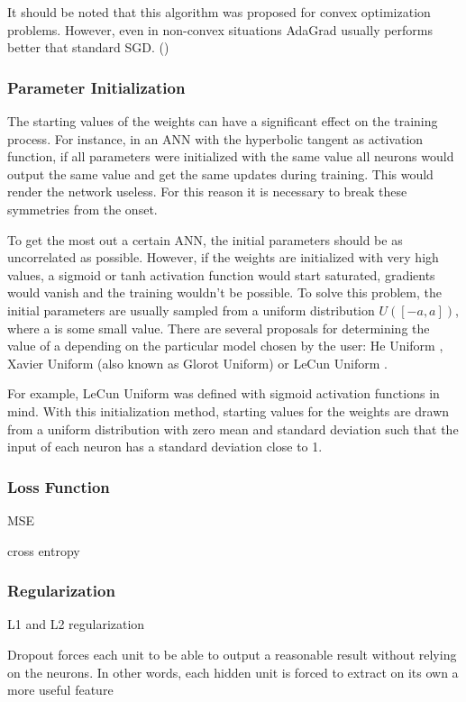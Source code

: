It should be noted that this algorithm was proposed for convex optimization problems. However, even in non-convex situations AdaGrad usually performs better that standard SGD. (\cite{gupta2014training})

\subsubsection{Parameter Initialization}

The starting values of the weights can have a significant effect on the training process. For instance, in an ANN with the hyperbolic tangent as activation function, if all parameters were initialized with the same value all neurons would output the same value and get the same updates during training. This would render the network useless. For this reason it is necessary to break these symmetries from the onset.

To get the most out a certain ANN, the initial parameters should be as  uncorrelated as possible. However, if the weights are initialized with very high values, a sigmoid or tanh activation function would start saturated, gradients would vanish and the training wouldn't be possible.
To solve this problem, the initial parameters are usually  sampled from a uniform distribution $U([-a,a])$, where a is some small value. There are several proposals for determining the value of a depending on the particular model chosen by the user: He Uniform \cite{he2015delving}, Xavier Uniform \cite{glorot2010understanding} (also known as Glorot Uniform) or LeCun Uniform \cite{lecun2012efficient}.

For example, LeCun Uniform was defined with sigmoid activation functions in mind. With this initialization method, starting values for the weights are drawn from a uniform distribution with zero mean and standard deviation such that the input of each neuron has a standard deviation close to 1.

\subsubsection{Loss Function}
\label{subsubsec:loss-function}
MSE

cross entropy

\subsubsection{Regularization}

L1 and L2 regularization

Dropout
forces each unit to be able to output a reasonable result without relying on the neurons. In other words, each hidden unit is forced to extract on its own a more useful feature
